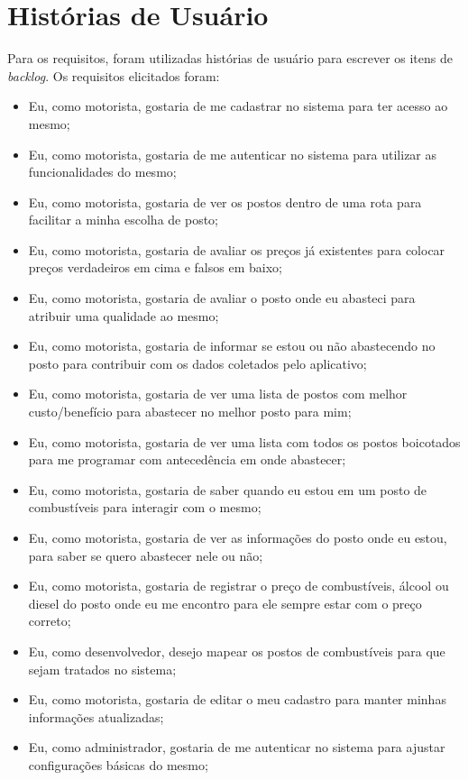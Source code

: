 \section{Histórias de Usuário}

Para os requisitos, foram utilizadas histórias de usuário para escrever os itens de \textit{backlog}. Os requisitos elicitados foram:
\begin{itemize}
    \item Eu, como motorista, gostaria de me cadastrar no sistema para ter acesso ao mesmo;
    \item Eu, como motorista, gostaria de me autenticar no sistema para utilizar as funcionalidades do mesmo;
    \item Eu, como motorista, gostaria de ver os postos dentro de uma rota para facilitar a minha escolha de posto;
    \item Eu, como motorista, gostaria de avaliar os preços já existentes para colocar preços verdadeiros em cima e falsos em baixo;
    \item Eu, como motorista, gostaria de avaliar o posto onde eu abasteci para atribuir uma qualidade ao mesmo;
    \item Eu, como motorista, gostaria de informar se estou ou não abastecendo no posto para contribuir com os dados coletados pelo aplicativo;
    \item Eu, como motorista, gostaria de ver uma lista de postos com melhor custo/benefício para abastecer no melhor posto para mim;
    \item Eu, como motorista, gostaria de ver uma lista com todos os postos boicotados para me programar com antecedência em onde abastecer;
    \item Eu, como motorista, gostaria de saber quando eu estou em um posto de combustíveis para interagir com o mesmo;
    \item Eu, como motorista, gostaria de ver as informações do posto onde eu estou, para saber se quero abastecer nele ou não;
    \item Eu, como motorista, gostaria de registrar o preço de combustíveis, álcool ou diesel do posto onde eu me encontro para ele sempre estar com o preço correto;
    \item Eu, como desenvolvedor, desejo mapear os postos de combustíveis para que sejam tratados no sistema;
    \item Eu, como motorista, gostaria de editar o meu cadastro para manter minhas informações atualizadas;
    \item Eu, como administrador, gostaria de me autenticar no sistema para ajustar configurações básicas do mesmo;

\end{itemize}
